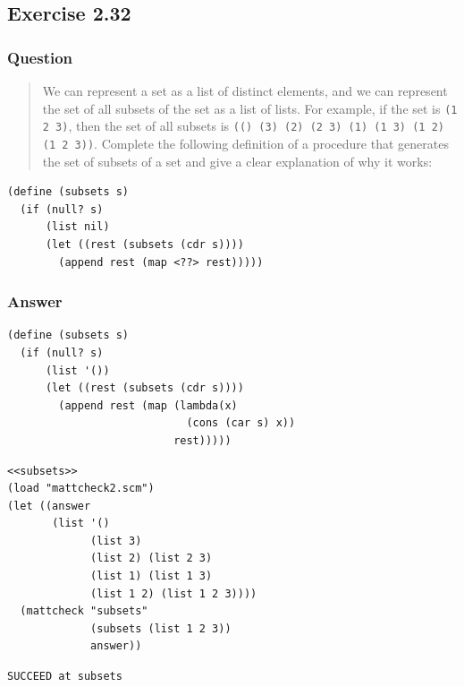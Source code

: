 \documentclass[final,fleqn,titlepage,twoside]{article}
\begin{document}
\subsection{Exercise 2.32}
\label{sec:org4026b21}
\subsubsection{Question}
\label{sec:org0cd19ad}
\begin{quote}
We can represent a set as a list of distinct elements, and we can represent the
set of all subsets of the set as a list of lists. For example, if the set is
\texttt{(1 2 3)}, then the set of all subsets is \texttt{(() (3) (2) (2 3) (1) (1 3) (1 2) (1 2 3))}. Complete the following definition of a procedure that
generates the set of subsets of a set and give a clear explanation of why it
works:
\end{quote}

\begin{verbatim}
(define (subsets s)
  (if (null? s)
      (list nil)
      (let ((rest (subsets (cdr s))))
        (append rest (map <??> rest)))))
\end{verbatim}

\subsubsection{Answer}
\label{sec:org434e30e}
\begin{verbatim}
(define (subsets s)
  (if (null? s)
      (list '())
      (let ((rest (subsets (cdr s))))
        (append rest (map (lambda(x)
                            (cons (car s) x))
                          rest)))))
\end{verbatim}

\begin{verbatim}
<<subsets>>
(load "mattcheck2.scm")
(let ((answer
       (list '()
             (list 3)
             (list 2) (list 2 3)
             (list 1) (list 1 3)
             (list 1 2) (list 1 2 3))))
  (mattcheck "subsets"
             (subsets (list 1 2 3))
             answer))
\end{verbatim}

\begin{verbatim}
SUCCEED at subsets
\end{verbatim}
\end{document}
